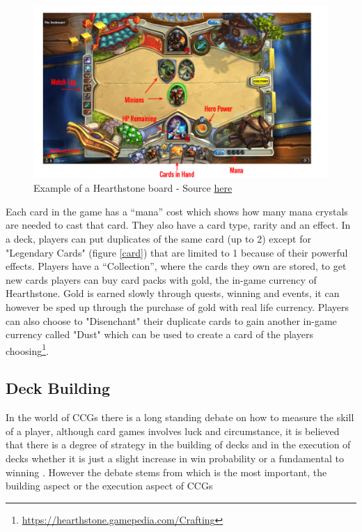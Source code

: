 \documentclass{report}
\begin{document}
\begin{figure}[h]
\centering
\includegraphics[width=1\textwidth]{hearthstonegameboard}
\caption{Example of a Hearthstone board - Source
 \href{https://bothgunsblazingblog.wordpress.com/2014/06/22/hearthstone-analysis-and-deconstruction/}{here}  }
 \label{board}
\end{figure}
	
	Each card in the game has a “mana” cost which shows how many mana crystals are needed to cast that card. They also have a card type, rarity and an effect. In a deck, players can put duplicates of the same card (up to 2) except for "Legendary Cards" (figure \ref{card}) that are limited to 1 because of their powerful effects.  Players have a “Collection”, where the cards they own are stored, to get new cards players can buy card packs with gold, the in-game currency of Hearthstone. Gold is earned slowly through quests, winning and events, it can however be sped up through the purchase of gold with real life currency. Players can also choose to "Disenchant" their duplicate cards to gain another in-game currency called "Dust" which can be used to create a card of the players choosing\footnote{\url{https://hearthstone.gamepedia.com/Crafting}}.


\subsection{Deck Building}
	In the world of CCGs there is a long standing debate on how to measure the skill of a player, although card games involves luck and circumstance, it is believed that there is a degree of strategy in the building of decks and in the execution of decks whether it is just a slight increase in win probability or a fundamental to winning \cite{SvsL}. However the debate stems from which is the most important, the building aspect or the execution aspect of CCGs
	\cite{BvsP}
\end{document}
